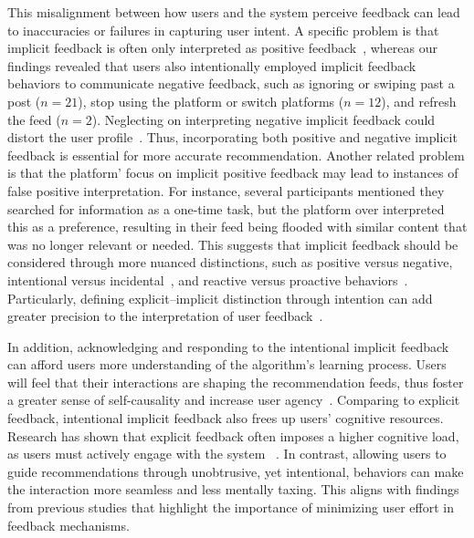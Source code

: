 This misalignment between how users and the system perceive feedback can lead to inaccuracies or failures in capturing user intent. A specific problem is that implicit feedback is often only interpreted as positive feedback~\cite{jawaheer2014modeling,hu2008collaborative}, whereas our findings revealed that users also intentionally employed implicit feedback behaviors to communicate negative feedback, such as ignoring or swiping past a post ($n = 21$), stop using the platform or switch platforms ($n = 12$), and refresh the feed ($n = 2$). Neglecting on interpreting negative implicit feedback could distort the user profile~\cite{hu2008collaborative}. Thus, incorporating both positive and negative implicit feedback is essential for more accurate recommendation. Another related problem is that the platform' focus on implicit positive feedback may lead to instances of false positive interpretation. For instance, several participants mentioned they searched for information as a one-time task, but the platform over interpreted this as a preference, resulting in their feed being flooded with similar content that was no longer relevant or needed. This suggests that implicit feedback should be considered through more nuanced distinctions, such as positive versus negative, intentional versus incidental~\cite{dix2002beyond}, and reactive versus proactive behaviors~\cite{ju2008range}. Particularly, defining explicit–implicit distinction through intention can add greater precision to the interpretation of user feedback~\cite{serim2019explicating}. 

In addition, acknowledging and responding to the intentional implicit feedback can afford users more understanding of the algorithm’s learning process. Users will feel that their interactions are shaping the recommendation feeds, thus foster a greater sense of self-causality and increase user agency~\cite{feng2024mapping}. Comparing to explicit feedback, intentional implicit feedback also frees up users’ cognitive resources. Research has shown that explicit feedback often imposes a higher cognitive load, as users must actively engage with the system ~\cite{kelly2003implicit,gadanho2007addressing}. In contrast, allowing users to guide recommendations through unobtrusive, yet intentional, behaviors can make the interaction more seamless and less mentally taxing. This aligns with findings from previous studies that highlight the importance of minimizing user effort in feedback mechanisms.

